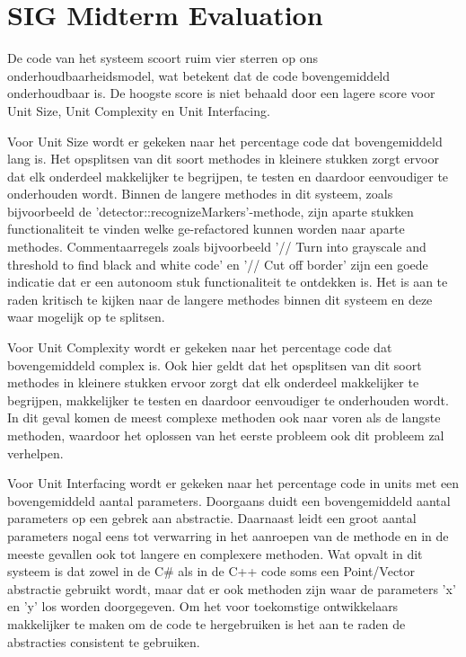 \chapter{SIG Midterm Evaluation} \label{app:sig1}


	De code van het systeem scoort ruim vier sterren op ons 
	onderhoudbaarheidsmodel, wat betekent dat de code bovengemiddeld 
	onderhoudbaar is. De hoogste score is niet behaald door een lagere score
	voor Unit Size, Unit Complexity en Unit Interfacing.

	Voor Unit Size wordt er gekeken naar het percentage code dat bovengemiddeld 
	lang is. Het opsplitsen van dit soort methodes in kleinere stukken zorgt 
	ervoor dat elk onderdeel makkelijker te begrijpen, te testen en daardoor 
	eenvoudiger te onderhouden wordt. Binnen de langere methodes in dit systeem, 
	zoals bijvoorbeeld de 'detector::recognizeMarkers'-methode, zijn aparte 
	stukken functionaliteit te vinden welke ge-refactored kunnen worden naar 
	aparte methodes. Commentaarregels zoals bijvoorbeeld '// Turn into grayscale 
	and threshold to find black and white code' en '// Cut off border' zijn een 
	goede indicatie dat er een autonoom stuk functionaliteit te ontdekken is. Het 
	is aan te raden kritisch te kijken naar de langere methodes binnen dit systeem 
	en deze waar mogelijk op te splitsen.

	Voor Unit Complexity wordt er gekeken naar het percentage code dat bovengemiddeld complex is. Ook hier geldt dat het opsplitsen van dit soort methodes in kleinere stukken ervoor zorgt dat elk onderdeel makkelijker te begrijpen, makkelijker te testen en daardoor eenvoudiger te onderhouden wordt. In dit geval komen de meest complexe methoden ook naar voren als de langste methoden, waardoor het oplossen van het eerste probleem ook dit probleem zal verhelpen.

	Voor Unit Interfacing wordt er gekeken naar het percentage code in units met een bovengemiddeld aantal parameters. Doorgaans duidt een bovengemiddeld aantal parameters op een gebrek aan abstractie. Daarnaast leidt een groot aantal parameters nogal eens tot verwarring in het aanroepen van de methode en in de meeste gevallen ook tot langere en complexere methoden. Wat opvalt in dit systeem is dat zowel in de C\# als in de C++ code soms een Point/Vector abstractie gebruikt wordt, maar dat er ook methoden zijn waar de  parameters 'x' en 'y' los worden doorgegeven. Om het voor toekomstige ontwikkelaars makkelijker te maken om de code te hergebruiken is het aan te raden de abstracties consistent te gebruiken. 

